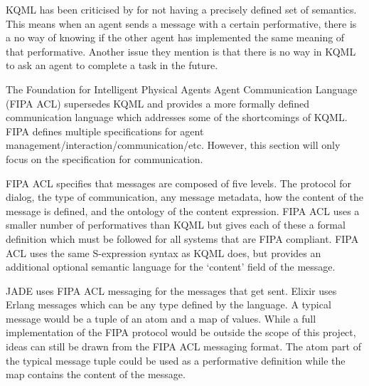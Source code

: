 KQML has been criticised by  for not having a precisely defined set of semantics.
This means when an agent sends a message with a certain performative, there is a no way of knowing if the other agent has implemented the same meaning of that performative.
Another issue they mention is that there is no way in KQML to ask an agent to complete a task in the future.

The Foundation for Intelligent Physical Agents Agent Communication Language (FIPA ACL) supersedes KQML and provides a more formally defined communication language which addresses some of the shortcomings of KQML\@.
FIPA defines multiple specifications for agent management/interaction/communication/etc.
However, this section will only focus on the specification for communication.

FIPA ACL specifies that messages are composed of five levels.
The protocol for dialog, the type of communication, any message metadata, how the content of the message is defined, and the ontology of the content expression.
FIPA ACL uses a smaller number of performatives than KQML but gives each of these a formal definition which must be followed for all systems that are FIPA compliant.
FIPA ACL uses the same S-expression syntax as KQML does, but provides an additional optional semantic language for the `content' field of the message.~\cite{obrien1998fipa}

JADE uses FIPA ACL messaging for the messages that get sent.
Elixir uses Erlang messages which can be any type defined by the language.
A typical message would be a tuple of an atom and a map of values.
While a full implementation of the FIPA protocol would be outside the scope of this project, ideas can still be drawn from the FIPA ACL messaging format.
The atom part of the typical message tuple could be used as a performative definition while the map contains the content of the message.
